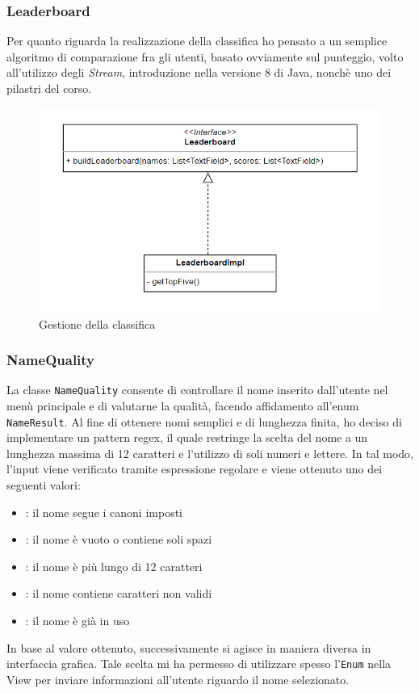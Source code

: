 \documentclass[a4paper,12pt]{report}
\begin{document}
\subsubsection{Leaderboard}
Per quanto riguarda la realizzazione della classifica ho pensato a un semplice algoritmo di comparazione fra gli utenti, basato ovviamente sul punteggio, volto all'utilizzo degli \textit{Stream}, introduzione nella versione 8 di Java, nonchè uno dei pilastri del corso. 
\begin{figure}[H]
    \begin{center}
        \centering
        \includegraphics[width=\textwidth]{img/Design/Severi/Leaderboard.png}
    \end{center}
    \caption{Gestione della classifica}
    \label{img:leaderboard}
\end{figure}

\subsubsection{NameQuality}
La classe \texttt{NameQuality} consente di controllare il nome inserito dall'utente nel menù principale e di valutarne la qualità, facendo affidamento all'enum \texttt{NameResult}. Al fine di ottenere nomi semplici e di lunghezza finita, ho deciso di implementare un pattern regex, il quale restringe la scelta del nome a un lunghezza massima di 12 caratteri e l'utilizzo di soli numeri e lettere. In tal modo, l'input viene verificato tramite espressione regolare e viene ottenuto uno dei seguenti valori:
\begin{itemize}
    \item {}: il nome segue i canoni imposti
    \item {}: il nome è vuoto o contiene soli spazi
    \item {}: il nome è più lungo di 12 caratteri
    \item {}: il nome contiene caratteri non validi
    \item {}: il nome è già in uso
\end{itemize}
\noindent In base al valore ottenuto, successivamente si agisce in maniera diversa in interfaccia grafica. Tale scelta mi ha permesso di utilizzare spesso l'\texttt{Enum} nella View per inviare informazioni all'utente riguardo il nome selezionato.
\end{document}
